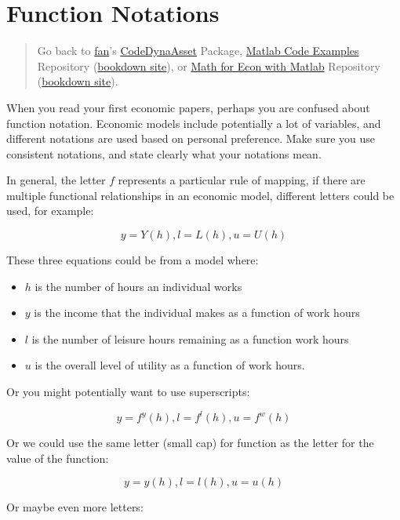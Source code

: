 \documentclass[
]{book}
\begin{document}
\hypertarget{function-notations}{%
\section{Function Notations}\label{function-notations}}

\begin{quote}
Go back to \href{http://fanwangecon.github.io/}{fan}'s \href{https://fanwangecon.github.io/CodeDynaAsset/}{CodeDynaAsset} Package, \href{https://fanwangecon.github.io/M4Econ/}{Matlab Code Examples} Repository (\href{https://fanwangecon.github.io/M4Econ/bookdown}{bookdown site}), or \href{https://fanwangecon.github.io/Math4Econ/}{Math for Econ with Matlab} Repository (\href{https://fanwangecon.github.io/Math4Econ/bookdown}{bookdown site}).
\end{quote}

When you read your first economic papers, perhaps you are confused about
function notation. Economic models include potentially a lot of
variables, and different notations are used based on personal
preference. Make sure you use consistent notations, and state clearly
what your notations mean.

In general, the letter \(f\) represents a particular rule of mapping, if
there are multiple functional relationships in an economic model,
different letters could be used, for example:

\[y=Y(h),l=L(h),u=U(h)\]

These three equations could be from a model where:

\begin{itemize}
\item
  \(h\) is the number of hours an individual works
\item
  \(y\) is the income that the individual makes as a function of work
  hours
\item
  \(l\) is the number of leisure hours remaining as a function work
  hours
\item
  \(u\) is the overall level of utility as a function of work hours.
\end{itemize}

Or you might potentially want to use superscripts:

\[y=f^y (h),l=f^l (h),u=f^w (h)\]

Or we could use the same letter (small cap) for function as the letter
for the value of the function:

\[y=y(h),l=l(h),u=u(h)\]

Or maybe even more letters:
\end{document}
